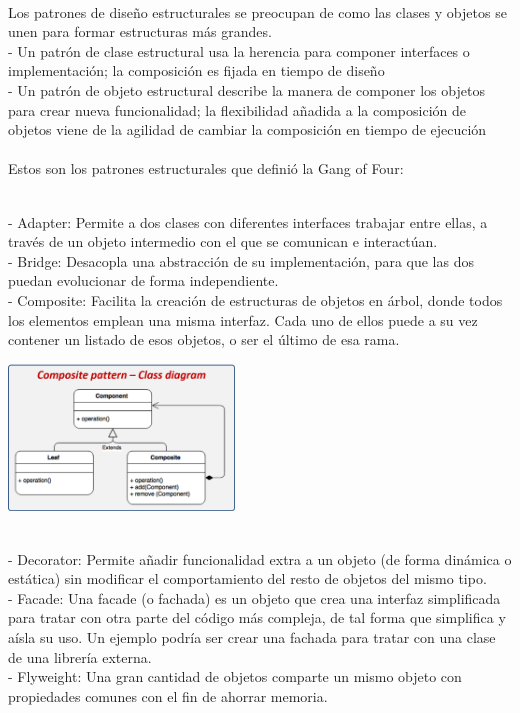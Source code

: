 \documentclass[twoside,twocolumn]{article}
\begin{document}
\begin{itemize}
\\Los patrones de diseño estructurales se preocupan de
como las clases y objetos se unen para formar
estructuras más grandes.
\\- Un patrón de clase estructural usa la herencia para componer interfaces o implementación; la composición es fijada en tiempo de diseño
\\- Un patrón de objeto estructural describe la manera de componer los objetos para crear nueva funcionalidad;
la flexibilidad añadida a la composición de objetos
viene de la agilidad de cambiar la composición en
tiempo de ejecución\\
\\Estos son los patrones estructurales que definió la Gang of Four:

\\- Adapter: Permite a dos clases con diferentes interfaces trabajar entre ellas, a través de un objeto intermedio con el que se comunican e interactúan.
\\- Bridge: Desacopla una abstracción de su implementación, para que las dos puedan evolucionar de forma independiente.
\\- Composite: Facilita la creación de estructuras de objetos en árbol, donde todos los elementos emplean una misma interfaz. Cada uno de ellos puede a su vez contener un listado de esos objetos, o ser el último de esa rama.
	\begin{center}
	\includegraphics[width=6cm]{./imagenes/est.png} 
	\end{center}
\\- Decorator: Permite añadir funcionalidad extra a un objeto (de forma dinámica o estática) sin modificar el comportamiento del resto de objetos del mismo tipo.
\\- Facade: Una facade (o fachada) es un objeto que crea una interfaz simplificada para tratar con otra parte del código más compleja, de tal forma que simplifica y aísla su uso. Un ejemplo podría ser crear una fachada para tratar con una clase de una librería externa.
\\- Flyweight: Una gran cantidad de objetos comparte un mismo objeto con propiedades comunes con el fin de ahorrar memoria.

\end{itemize}
\end{document}
